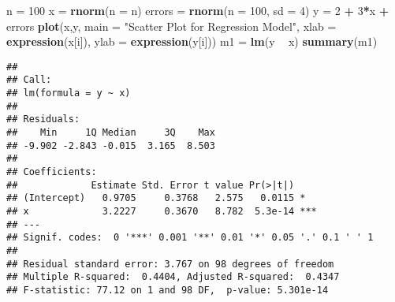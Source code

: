 \documentclass[]{article}
\newenvironment{Shaded}{\begin{snugshade}}{\end{snugshade}}
\newcommand{\KeywordTok}[1]{\textcolor[rgb]{0.13,0.29,0.53}{\textbf{#1}}}
\newcommand{\DataTypeTok}[1]{\textcolor[rgb]{0.13,0.29,0.53}{#1}}
\newcommand{\DecValTok}[1]{\textcolor[rgb]{0.00,0.00,0.81}{#1}}
\newcommand{\StringTok}[1]{\textcolor[rgb]{0.31,0.60,0.02}{#1}}
\newcommand{\OperatorTok}[1]{\textcolor[rgb]{0.81,0.36,0.00}{\textbf{#1}}}
\newcommand{\NormalTok}[1]{#1}
\begin{document}
\begin{Shaded}
\begin{Highlighting}[]
\NormalTok{n =}\StringTok{ }\DecValTok{100}
\NormalTok{x =}\StringTok{ }\KeywordTok{rnorm}\NormalTok{(}\DataTypeTok{n =}\NormalTok{ n)}
\NormalTok{errors =}\StringTok{ }\KeywordTok{rnorm}\NormalTok{(}\DataTypeTok{n =} \DecValTok{100}\NormalTok{, }\DataTypeTok{sd =} \DecValTok{4}\NormalTok{)}
\NormalTok{y =}\StringTok{ }\DecValTok{2} \OperatorTok{+}\StringTok{ }\DecValTok{3}\OperatorTok{*}\NormalTok{x }\OperatorTok{+}\StringTok{ }\NormalTok{errors}
\KeywordTok{plot}\NormalTok{(x,y, }\DataTypeTok{main =} \StringTok{"Scatter Plot for Regression Model"}\NormalTok{, }\DataTypeTok{xlab =} \KeywordTok{expression}\NormalTok{(x[i]), }\DataTypeTok{ylab =} \KeywordTok{expression}\NormalTok{(y[i]))}
\NormalTok{m1 =}\StringTok{ }\KeywordTok{lm}\NormalTok{(y }\OperatorTok{~}\StringTok{ }\NormalTok{x)}
\KeywordTok{summary}\NormalTok{(m1)}
\end{Highlighting}
\end{Shaded}

\begin{verbatim}
## 
## Call:
## lm(formula = y ~ x)
## 
## Residuals:
##    Min     1Q Median     3Q    Max 
## -9.902 -2.843 -0.015  3.165  8.503 
## 
## Coefficients:
##             Estimate Std. Error t value Pr(>|t|)    
## (Intercept)   0.9705     0.3768   2.575   0.0115 *  
## x             3.2227     0.3670   8.782  5.3e-14 ***
## ---
## Signif. codes:  0 '***' 0.001 '**' 0.01 '*' 0.05 '.' 0.1 ' ' 1
## 
## Residual standard error: 3.767 on 98 degrees of freedom
## Multiple R-squared:  0.4404, Adjusted R-squared:  0.4347 
## F-statistic: 77.12 on 1 and 98 DF,  p-value: 5.301e-14
\end{verbatim}
\end{document}
